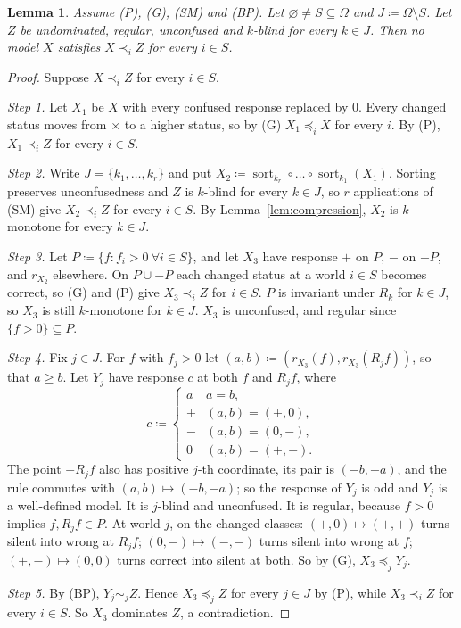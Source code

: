 \documentclass[11pt]{article}
\newcommand{\chg}[1]{{\color{red}#1}}
\newtheorem{lemma}[theorem]{Lemma}
\theoremstyle{definition}
\theoremstyle{remark}
\newcommand{\conf}{\times}
\begin{document}
\begin{lemma}\label{lem:face}
Assume (P), (G), (SM) and (BP). Let $\varnothing\neq S\subseteq\Omega$ and $J\coloneqq\Omega\setminus S$. Let $Z$ be undominated, regular, unconfused and $k$-blind for every $k\in J$. Then no model $X$ satisfies $X\prec_iZ$ for every $i\in S$.
\end{lemma}
\begin{proof}
Suppose $X\prec_iZ$ for every $i\in S$.

\emph{Step 1.} Let $X_1$ be $X$ with every confused response replaced by $0$. Every changed status moves from $\conf$ to a higher status, so by (G) $X_1\preceq_iX$ for every $i$. By (P), $X_1\prec_iZ$ for every $i\in S$.

\emph{Step 2.} Write $J=\{k_1,\dots,k_r\}$ and put $X_2\coloneqq\operatorname{sort}_{k_r}\circ\dots\circ\operatorname{sort}_{k_1}(X_1)$. Sorting preserves unconfusedness and $Z$ is $k$-blind for every $k\in J$, so $r$ applications of (SM) give $X_2\prec_iZ$ for every $i\in S$. By Lemma~\ref{lem:compression}, $X_2$ is $k$-monotone for every $k\in J$.

\emph{Step 3.} Let $P\coloneqq\{f:f_i>0\ \forall i\in S\}$, and let $X_3$ have response $+$ on $P$, $-$ on $-P$, and $r_{X_2}$ elsewhere. On $P\cup-P$ each changed status at a world $i\in S$ becomes correct, so (G) and (P) give $X_3\prec_iZ$ for $i\in S$. $P$ is invariant under $R_k$ for $k\in J$, so $X_3$ is still $k$-monotone for $k\in J$. $X_3$ is unconfused, and regular since $\{f>0\}\subseteq P$.

\emph{Step 4.} Fix $j\in J$. For $f$ with $f_j>0$ let $(a,b)\coloneqq(r_{X_3}(f),r_{X_3}(R_jf))$, so that $a\ge b$. Let $Y_j$ have response $c$ at both $f$ and $R_jf$, where
\[
c\coloneqq\begin{cases}a&a=b,\\ +&(a,b)=(+,0),\\ -&(a,b)=(0,-),\\ 0&(a,b)=(+,-).\end{cases}
\]
\chg{The point $-R_jf$ also has positive $j$-th coordinate, its pair is $(-b,-a)$, and the rule commutes with $(a,b)\mapsto(-b,-a)$; so the response of $Y_j$ is odd and $Y_j$ is a well-defined model.} It is $j$-blind and unconfused. It is regular, because $f>0$ implies $f,R_jf\in P$. At world $j$, on the changed classes: $(+,0)\mapsto(+,+)$ turns silent into wrong at $R_jf$; $(0,-)\mapsto(-,-)$ turns silent into wrong at $f$; $(+,-)\mapsto(0,0)$ turns correct into silent at both. So by (G), $X_3\preceq_jY_j$.

\emph{Step 5.} By (BP), $Y_j\sim_jZ$. Hence $X_3\preceq_jZ$ for every $j\in J$ by (P), while $X_3\prec_iZ$ for every $i\in S$. So $X_3$ dominates $Z$, a contradiction.
\end{proof}
\end{document}
